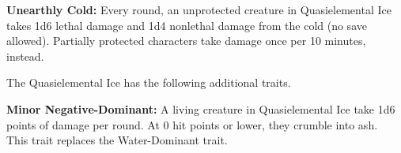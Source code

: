 \textbf{Unearthly Cold:} Every round, an unprotected creature in Quasielemental Ice takes 1d6 lethal damage and 1d4 nonlethal damage from the cold (no save allowed). Partially protected characters take damage once per 10 minutes, instead.

The Quasielemental Ice has the following additional traits.
\begin{itemize*}
\item \textbf{Minor Negative-Dominant:} A living creature in Quasielemental Ice take 1d6 points of damage per round. At 0 hit points or lower, they crumble into ash.\\

This trait replaces the Water-Dominant trait.
\end{itemize*}
